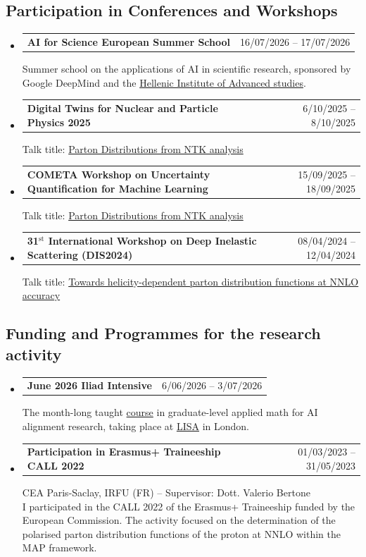 \documentclass[10pt,a4paper]{article}
\makeatletter
\newcommand{\headerrow}[2]
{\begin{tabular*}{\linewidth}{l@{\extracolsep{\fill}}r}
	#1 &
	#2 \\
\end{tabular*}}
\makeatother
\begin{document}
\subsection*{Participation in Conferences and Workshops}
\begin{itemize}[leftmargin=1em]
    \item[]
    \headerrow
      {\textbf{AI for Science European Summer School}} 
      {16/07/2026 -- 17/07/2026} 
      Summer school on the applications of AI in scientific
      research, sponsored by Google DeepMind and the \href{https://www.aiforscience.school}{Hellenic Institute of
      Advanced studies}.
    \item[]
    \headerrow
      {\textbf{Digital Twins for Nuclear and Particle Physics 2025}}
      {6/10/2025 -- 8/10/2025}
      Talk title: \href{https://agenda.infn.it/event/43958/contributions/273887/attachments/140953/213043/chiefa_nptwins_2025.pdf}{Parton Distributions from NTK analysis}
    \item[]
    \headerrow
      {\textbf{COMETA Workshop on Uncertainty Quantification for Machine Learning}}
      {15/09/2025 -- 18/09/2025}
      Talk title: \href{https://indico.cern.ch/event/1514154/contributions/6620158/attachments/3135730/5563888/20250916_nn_parton_distributions.pdf}{Parton Distributions from NTK analysis}
    \item[]
    \headerrow
      {\textbf{31$^{\textrm{st}}$ International Workshop on Deep Inelastic Scattering (DIS2024)}}
      {08/04/2024 -- 12/04/2024}
      Talk title: \href{https://lpsc-indico.in2p3.fr/event/3268/contributions/7472/attachments/5307/7968/DIS_2024_MAP_4_3.pdf}{Towards helicity-dependent parton distribution functions at NNLO accuracy}
\end{itemize}

\subsection*{Funding and Programmes for the research activity}
\begin{itemize}[leftmargin=1em]
    \item[]
      \headerrow
        {\textbf{June 2026 Iliad Intensive}} {6/06/2026 --
        3/07/2026} The month-long taught
        \href{https://www.lesswrong.com/posts/moG6k8mJiGvH4zc8j/what-is-the-iliad-intensive}{course}
        in graduate-level applied math for AI alignment research, taking place
        at \href{https://www.safeai.org.uk}{LISA} in London.
    \item[] 
      \headerrow
        {\textbf{Participation in Erasmus+ Traineeship CALL 2022}}
        {01/03/2023 -- 31/05/2023}
      CEA Paris-Saclay, IRFU (FR) -- Supervisor: Dott. Valerio Bertone \\[0.1em]
      I participated in the CALL 2022 of the Erasmus+ Traineeship funded by the European Commission. 
      The activity focused on the determination of the polarised parton distribution functions of the 
      proton at NNLO within the MAP framework.
\end{itemize}
\end{document}
